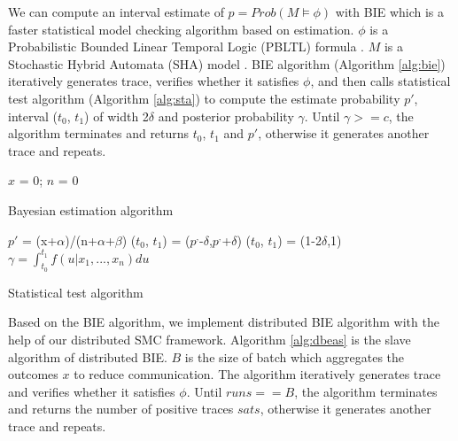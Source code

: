 We can compute an interval estimate of $p=Prob(M\models\phi)$ with BIE which is a faster statistical model checking algorithm based on estimation. $\phi$ is a Probabilistic Bounded Linear Temporal Logic (PBLTL) formula \cite{baier2008principles}. $M$ is a Stochastic Hybrid Automata (SHA) model \cite{David2014Statistical}. BIE algorithm (Algorithm \ref{alg:bie}) iteratively generates trace, verifies whether it satisfies $\phi$, and then calls statistical test algorithm (Algorithm \ref{alg:sta}) to compute the estimate probability $p'$, interval ($t_0$, $t_1$) of width 2$\delta$ and posterior probability $\gamma$. Until $\gamma >= c$, the algorithm terminates and returns $t_0$, $t_1$ and $p'$, otherwise it generates another trace and repeats.
\begin{algorithm}[t]
{}
$x$ = 0; $n$ = 0\;
\caption{Bayesian estimation algorithm}
\label{alg:bie}
\end{algorithm}
\begin{algorithm}[t]
{}
        $p'$ = (x+$\alpha$)/(n+$\alpha$+$\beta$)\;
        ($t_0$, $t_1$) = ($p^,$-$\delta$,$p^,$+$\delta$)\;
        {
           ($t_0$, $t_1$) = (1-2$\delta$,1)\;
         }{
          }
        $\gamma=\int_{t_0}^{t_1} {f(u|x_1,...,x_n)du}$\;
\caption{Statistical test algorithm}
\label{alg:sta}
\end{algorithm}
Based on the BIE algorithm, we implement distributed BIE algorithm with the help of our distributed SMC framework. Algorithm \ref{alg:dbeas} is the slave algorithm of distributed BIE. $B$ is the size of batch which aggregates the outcomes $x$ to reduce communication. The algorithm iteratively generates trace and verifies whether it satisfies $\phi$. Until $runs == B$, the algorithm terminates and returns the number of positive traces $sats$, otherwise it generates another trace and repeats.
